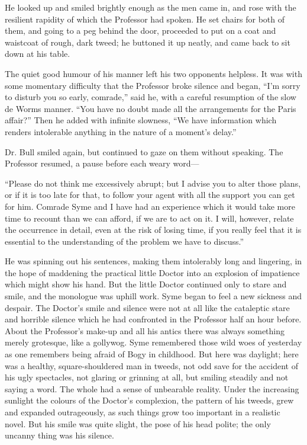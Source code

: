 \documentclass{book}
\begin{document}
He looked up and smiled brightly enough as the men came in, and rose with the resilient rapidity of which the Professor had spoken. He set chairs for both of them, and going to a peg behind the door, proceeded to put on a coat and waistcoat of rough, dark tweed; he buttoned it up neatly, and came back to sit down at his table.

The quiet good humour of his manner left his two opponents helpless. It was with some momentary difficulty that the Professor broke silence and began, “I’m sorry to disturb you so early, comrade,” said he, with a careful resumption of the slow de Worms manner. “You have no doubt made all the arrangements for the Paris affair?” Then he added with infinite slowness, “We have information which renders intolerable anything in the nature of a moment’s delay.”

Dr. Bull smiled again, but continued to gaze on them without speaking. The Professor resumed, a pause before each weary word—

“Please do not think me excessively abrupt; but I advise you to alter those plans, or if it is too late for that, to follow your agent with all the support you can get for him. Comrade Syme and I have had an experience which it would take more time to recount than we can afford, if we are to act on it. I will, however, relate the occurrence in detail, even at the risk of losing time, if you really feel that it is essential to the understanding of the problem we have to discuss.”

He was spinning out his sentences, making them intolerably long and lingering, in the hope of maddening the practical little Doctor into an explosion of impatience which might show his hand. But the little Doctor continued only to stare and smile, and the monologue was uphill work. Syme began to feel a new sickness and despair. The Doctor’s smile and silence were not at all like the cataleptic stare and horrible silence which he had confronted in the Professor half an hour before. About the Professor’s make-up and all his antics there was always something merely grotesque, like a gollywog. Syme remembered those wild woes of yesterday as one remembers being afraid of Bogy in childhood. But here was daylight; here was a healthy, square-shouldered man in tweeds, not odd save for the accident of his ugly spectacles, not glaring or grinning at all, but smiling steadily and not saying a word. The whole had a sense of unbearable reality. Under the increasing sunlight the colours of the Doctor’s complexion, the pattern of his tweeds, grew and expanded outrageously, as such things grow too important in a realistic novel. But his smile was quite slight, the pose of his head polite; the only uncanny thing was his silence.
\end{document}
